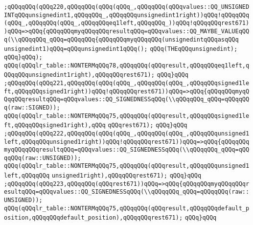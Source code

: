 \verb|;qQQqqQQq(qQQq220,qQQqqQQq(qQQq(qQQq_,qQQqqQQq(qQQqvalues::QQ_UNSIGNEDINTqQQqunsignedint1,qQQqqQQq_,qQQqqQQqunsignedint1right))qQQq!qQQqqQQq(qQQq_,qQQqqQQq(qQQq_,qQQqqQQqeq1left,qQQqqQQq_))qQQq!qQQqqQQqrest671))qQQq=>qQQq{qQQqqQQqmyqQQqqQQqresultqQQq=qQQqvalues::QQ_MAYBE_VALUEqQQq(\\qQQqqQQq_qQQq=qQQqqQQq{qQQqqQQqmyqQQqqQQq(unsignedintqQQqasqQQq|\newline
\verb|unsignedint1)qQQq=qQQqunsignedint1qQQq();|\newline
\verb|qQQq(THEqQQqunsignedint);|\newline
\verb|qQQq}qQQq);|\newline
\verb|qQQq(qQQqlr_table::NONTERMqQQq78,qQQqqQQq(qQQqresult,qQQqqQQqeq1left,qQQqqQQqunsignedint1right),qQQqqQQqrest671);|\newline
\verb|qQQq}qQQq|\newline
\verb|;qQQqqQQq(qQQq221,qQQqqQQq(qQQq(qQQq_,qQQqqQQq(qQQq_,qQQqqQQqsigned1left,qQQqqQQqsigned1right))qQQq!qQQqqQQqrest671))qQQq=>qQQq{qQQqqQQqmyqQQqqQQqresultqQQq=qQQqvalues::QQ_SIGNEDNESSqQQq(\\qQQqqQQq_qQQq=qQQqqQQq(raw::SIGNED));|\newline
\verb|qQQq(qQQqlr_table::NONTERMqQQq75,qQQqqQQq(qQQqresult,qQQqqQQqsigned1left,qQQqqQQqsigned1right),qQQq|\newline
\verb|qQQqrest671);|\newline
\verb|qQQq}qQQq|\newline
\verb|;qQQqqQQq(qQQq222,qQQqqQQq(qQQq(qQQq_,qQQqqQQq(qQQq_,qQQqqQQqunsigned1left,qQQqqQQqunsigned1right))qQQq!qQQqqQQqrest671))qQQq=>qQQq{qQQqqQQqmyqQQqqQQqresultqQQq=qQQqvalues::QQ_SIGNEDNESSqQQq(\\qQQqqQQq_qQQq=qQQqqQQq(raw::UNSIGNED));|\newline
\verb|qQQq(qQQqlr_table::NONTERMqQQq75,qQQqqQQq(qQQqresult,qQQqqQQqunsigned1left,qQQqqQQq|\newline
\verb|unsigned1right),qQQqqQQqrest671);|\newline
\verb|qQQq}qQQq|\newline
\verb|;qQQqqQQq(qQQq223,qQQqqQQq(qQQqrest671))qQQq=>qQQq{qQQqqQQqmyqQQqqQQqresultqQQq=qQQqvalues::QQ_SIGNEDNESSqQQq(\\qQQqqQQq_qQQq=qQQqqQQq(raw::UNSIGNED));|\newline
\verb|qQQq(qQQqlr_table::NONTERMqQQq75,qQQqqQQq(qQQqresult,qQQqqQQqdefault_position,qQQqqQQqdefault_position),qQQqqQQqrest671);|\newline
\verb|qQQq}qQQq|\newline
